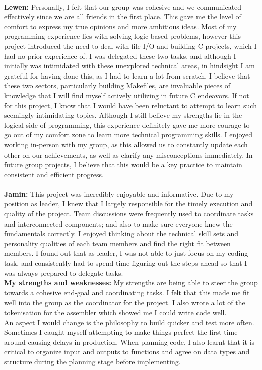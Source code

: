 \documentclass[11pt]{article}
\begin{document}
\\
\textbf{Lewen:} Personally, I felt that our group was cohesive and we communicated effectively since we are all friends in the first place. This gave me the level of comfort to express my true opinions and more ambitious ideas. Most of my programming experience lies with solving logic-based problems, however this project introduced the need to deal with file I/O and building C projects, which I had no prior experience of. I was delegated these two tasks, and although I initially was intimidated with these unexplored technical areas, in hindsight I am grateful for having done this, as I had to learn a lot from scratch. I believe that these two sectors, particularly building Makefiles, are invaluable pieces of knowledge that I will find myself actively utilizing in future C endeavors. If not for this project, I know that I would have been reluctant to attempt to learn such seemingly intimidating topics. Although I still believe my strengths lie in the logical side of programming, this experience definitely gave me more courage to go out of my comfort zone to learn more technical programming skills. I enjoyed working in-person with my group, as this allowed us to constantly update each other on our achievements, as well as clarify any misconceptions immediately. In future group projects, I believe that this would be a key practice to maintain consistent and efficient progress.\\
\\
\textbf{Jamin:} This project was incredibly enjoyable and informative. Due to my position as leader, I knew that I largely responsible for the timely execution and quality of the project. Team discussions were frequently used to coordinate tasks and interconnected components; and also to make sure everyone knew the fundamentals correctly. I enjoyed thinking about the technical skill sets and personality qualities of each team members and find the right fit between members. I found out that as leader, I was not able to just focus on my coding task, and consistently had to spend time figuring out the steps ahead so that I was always prepared to delegate tasks.\\
\textbf{My strengths and weaknesses: }My strengths are being able to steer the group towards a cohesive end-goal and coordinating tasks. I felt that this made me fit well into the group as the coordinator for the project. I also wrote a lot of the tokenisation for the assembler which showed me I could write code well.\\
An aspect I would change is the philosophy to build quicker and test more often. Sometimes I caught myself attempting to make things perfect the first time around causing delays in production. When planning code, I also learnt that it is critical to organize input and outputs to functions and agree on data types and structure during the planning stage before implementing.\\
\end{document}
